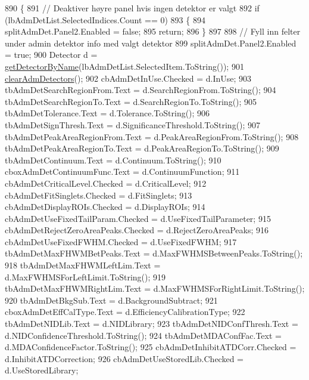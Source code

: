 \begin{DoxyCode}
890         \{
891             \textcolor{comment}{// Deaktiver høyre panel hvis ingen detektor er valgt}
892             \textcolor{keywordflow}{if} (lbAdmDetList.SelectedIndices.Count == 0)
893             \{
894                 splitAdmDet.Panel2.Enabled = \textcolor{keyword}{false};
895                 \textcolor{keywordflow}{return};
896             \}
897 
898             \textcolor{comment}{// Fyll inn felter under admin detektor info med valgt detektor}
899             splitAdmDet.Panel2.Enabled = \textcolor{keyword}{true};
900             Detector d = \hyperlink{class_scintilab_1_1_form_main_aff4482e0919480013a53fe56cfb374ba}{getDetectorByName}(lbAdmDetList.SelectedItem.ToString());
901             \hyperlink{class_scintilab_1_1_form_main_a79453298b8521054e8012d9df6fe6b93}{clearAdmDetectors}();
902             cbAdmDetInUse.Checked = d.InUse;
903             tbAdmDetSearchRegionFrom.Text = d.SearchRegionFrom.ToString();
904             tbAdmDetSearchRegionTo.Text = d.SearchRegionTo.ToString(); 
905             tbAdmDetTolerance.Text = d.Tolerance.ToString();
906             tbAdmDetSignThresh.Text = d.SignificanceThreshold.ToString();
907             tbAdmDetPeakAreaRegionFrom.Text = d.PeakAreaRegionFrom.ToString();
908             tbAdmDetPeakAreaRegionTo.Text = d.PeakAreaRegionTo.ToString();
909             tbAdmDetContinuum.Text = d.Continuum.ToString();
910             cboxAdmDetContinuumFunc.Text = d.ContinuumFunction;
911             cbAdmDetCriticalLevel.Checked = d.CriticalLevel;
912             cbAdmDetFitSinglets.Checked = d.FitSinglets;
913             cbAdmDetDisplayROIs.Checked = d.DisplayROIs;
914             cbAdmDetUseFixedTailParam.Checked = d.UseFixedTailParameter;
915             cbAdmDetRejectZeroAreaPeaks.Checked = d.RejectZeroAreaPeaks;
916             cbAdmDetUseFixedFWHM.Checked = d.UseFixedFWHM;
917             tbAdmDetMaxFHWMBetPeaks.Text = d.MaxFWHMSBetweenPeaks.ToString();
918             tbAdmDetMaxFHWMLeftLim.Text = d.MaxFWHMSForLeftLimit.ToString();
919             tbAdmDetMaxFHWMRightLim.Text = d.MaxFWHMSForRightLimit.ToString();
920             tbAdmDetBkgSub.Text = d.BackgroundSubtract;
921             cboxAdmDetEffCalType.Text = d.EfficiencyCalibrationType;
922             tbAdmDetNIDLib.Text = d.NIDLibrary;
923             tbAdmDetNIDConfThresh.Text = d.NIDConfidenceThreshold.ToString();
924             tbAdmDetMDAConfFac.Text = d.MDAConfidenceFactor.ToString();
925             cbAdmDetInhibitATDCorr.Checked = d.InhibitATDCorrection;
926             cbAdmDetUseStoredLib.Checked = d.UseStoredLibrary;

\end{DoxyCode}
